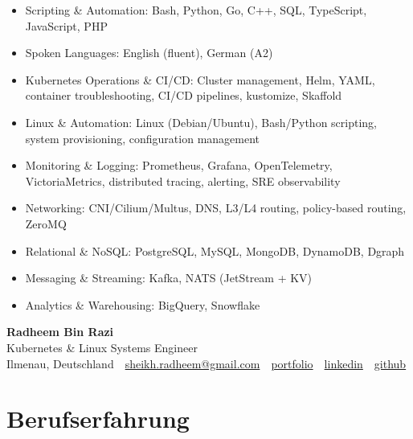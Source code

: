 \documentclass[10pt,a4paper]{resume}
\makeatletter
\newcommand{\Portfolio}{https://radheem.github.io/my-cv}
\newcommand{\PortfolioText}{portfolio}
\newcommand{\GitHub}{https://github.com/radheem}
\newcommand{\LinkedIn}{https://www.linkedin.com/in/radheem-razi}
\newcommand{\Email}{sheikh.radheem@gmail.com}
\makeatother
\begin{document}
\begin{itemize}[leftmargin=1.4em,nosep,topsep=2pt]
  \item Scripting \& Automation: Bash, Python, Go, C++, SQL, TypeScript, JavaScript, PHP
  \item Spoken Languages: English (fluent), German (A2)
  \item Kubernetes Operations \& CI/CD: Cluster management, Helm, YAML, container troubleshooting, CI/CD pipelines, kustomize, Skaffold
  \item Linux \& Automation: Linux (Debian/Ubuntu), Bash/Python scripting, system provisioning, configuration management
  \item Monitoring \& Logging: Prometheus, Grafana, OpenTelemetry, VictoriaMetrics, distributed tracing, alerting, SRE observability
  \item Networking: CNI/Cilium/Multus, DNS, L3/L4 routing, policy-based routing, ZeroMQ
  \item Relational \& NoSQL: PostgreSQL, MySQL, MongoDB, DynamoDB, Dgraph
  \item Messaging \& Streaming: Kafka, NATS (JetStream + KV)
  \item Analytics \& Warehousing: BigQuery, Snowflake
\end{itemize}

\clearpage
{}

\begin{center}
  {\huge\bfseries Radheem Bin Razi}\\[3pt]
  {\large Kubernetes \& Linux Systems Engineer}\\[6pt]
  \small
  Ilmenau, Deutschland \,\textbar\,
  \href{mailto:\Email}{\Email} \,\textbar\,
  \href{\Portfolio}{\PortfolioText} \,\textbar\,
  \href{\LinkedIn}{linkedin} \,\textbar\,
  \href{\GitHub}{github}
\end{center}
\vspace{2pt}

\section{Berufserfahrung}
\end{document}
